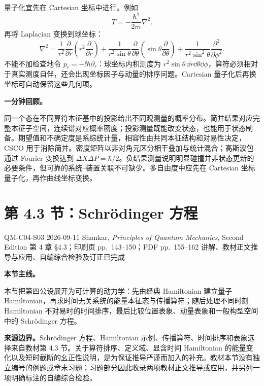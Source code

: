 量子化宜先在 Cartesian 坐标中进行。例如
\begin{equation}
  T=-\frac{\hbar^2}{2m}\nabla^2.
  \label{eq:QM-C04-S02-cartesian-kinetic-energy}
\end{equation}
再将 Laplacian 变换到球坐标：
\begin{equation}
  \nabla^2
  =\frac1{r^2}\frac{\partial}{\partial r}
    \left(r^2\frac{\partial}{\partial r}\right)
   +\frac1{r^2\sin\theta}\frac{\partial}{\partial\theta}
    \left(\sin\theta\frac{\partial}{\partial\theta}\right)
   +\frac1{r^2\sin^2\theta}\frac{\partial^2}{\partial\phi^2}.
  \label{eq:QM-C04-S02-spherical-laplacian}
\end{equation}
不能不加检查地令 $p_r=-\ii\hbar\partial_r$：球坐标内积测度为 $r^2\sin\theta\,\dd r\dd\theta\dd\phi$，算符必须相对于真实测度自伴，还会出现坐标因子与动量的排序问题。Cartesian 量子化后再换坐标可自动保留这些几何项。

\textbf{一分钟回顾。}

同一个态在不同算符本征基中的投影给出不同观测量的概率分布。简并结果对应完整本征子空间，连续谱对应概率密度；投影测量既能改变状态，也能用于状态制备。期望值和不确定度是系综统计量，相容性由共同本征结构和对易性决定，CSCO 用于消除简并。密度矩阵以非对角元区分相干叠加与统计混合；高斯波包通过 Fourier 变换达到 $\Delta X\Delta P=\hbar/2$。负结果测量说明明显碰撞并非状态更新的必要条件，但可靠的系统--装置关联不可缺少。多自由度中应先在 Cartesian 坐标量子化，再作曲线坐标变换。

\section{第 4.3 节：Schrödinger 方程}
\label{section:QM-C04-S03}

\studymeta
  {QM-C04-S03}
  {2026-09-11}
  {Shankar, \textit{Principles of Quantum Mechanics}, Second Edition}
  {第 4 章 \S 4.3；印刷页 pp.~143--150；PDF pp.~155--162}
  {讲解、教材正文推导与应用、自编综合检验及订正已完成}

\textbf{本节主线。}

本节把第四公设展开为可计算的动力学：先由经典 Hamiltonian 建立量子 Hamiltonian，再求时间无关系统的能量本征态与传播算符；随后处理不同时刻 Hamiltonian 不对易时的时间排序，最后比较位置表象、动量表象和一般构型空间中的 Schrödinger 方程。

\textbf{来源边界。}Schrödinger 方程、Hamiltonian 示例、传播算符、时间排序和表象选择来自教材第 4.3 节。关于算符排序、定义域、显含时间 Hamiltonian 的能量变化以及短时截断的幺正性说明，是为保证推导严谨而加入的补充。教材本节没有独立编号的例题或章末习题；习题部分因此收录两项教材正文推导或应用，并另列一项明确标注的自编综合检验。

